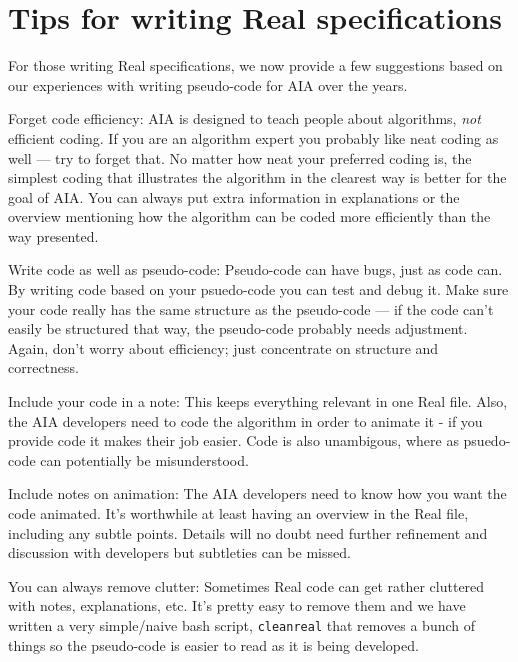 \documentclass[11pt]{article}
\begin{document}
\section{Tips for writing Real specifications}

For those writing Real specifications, we now provide a few suggestions
based on our experiences with writing pseudo-code for AIA over the
years.

\begin{description}
\item{Forget code efficiency:}
AIA is designed to teach people about algorithms, \emph{not} efficient
coding.  If you are an algorithm expert you probably like neat coding as
well --- try to forget that. No matter how neat your preferred coding is,
the simplest coding that illustrates the algorithm in the clearest way
is better for the goal of AIA.  You can always put extra information in
explanations or the overview mentioning how the algorithm can be coded
more efficiently than the way presented.

\item{Write code as well as pseudo-code:}
Pseudo-code can have bugs, just as code can. By writing code based on
your psuedo-code you can test and debug it. Make sure your code
really has the same structure as the pseudo-code --- if the code can't
easily be structured that way, the pseudo-code probably needs adjustment.
Again, don't worry about efficiency; just concentrate on structure and
correctness.

\item{Include your code in a note:}
This keeps everything relevant in one Real file.  Also, the AIA
developers need to code the algorithm in order to animate it - if you
provide code it makes their job easier.  Code is also unambigous, where
as psuedo-code can potentially be misunderstood.

\item{Include notes on animation:}
The AIA developers need to know how you want the code animated.
It's worthwhile at least having an overview in the Real file, including
any subtle points.  Details will no doubt need further refinement and
discussion with developers but subtleties can be missed.

\item{You can always remove clutter:}
Sometimes Real code can get rather cluttered with notes, explanations,
etc. It's pretty easy to remove them and we have written a very
simple/naive bash script, \texttt{cleanreal} that removes a bunch of
things so the pseudo-code is easier to read as it is being developed.


\end{description}
\end{document}
